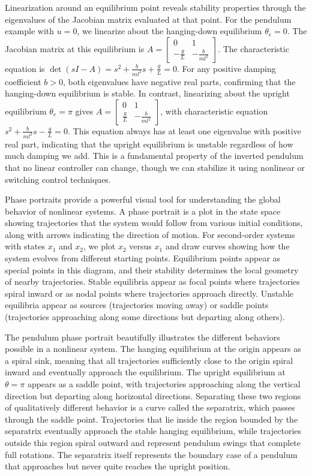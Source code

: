 Linearization around an equilibrium point reveals stability properties through the eigenvalues of the Jacobian matrix evaluated at that point. For the pendulum example with $u = 0$, we linearize about the hanging-down equilibrium $\theta_e = 0$. The Jacobian matrix at this equilibrium is $A = \begin{bmatrix} 0 & 1 \\ -\frac{g}{L} & -\frac{b}{ml^2} \end{bmatrix}$. The characteristic equation is $\det(sI - A) = s^2 + \frac{b}{ml^2}s + \frac{g}{L} = 0$. For any positive damping coefficient $b > 0$, both eigenvalues have negative real parts, confirming that the hanging-down equilibrium is stable. In contrast, linearizing about the upright equilibrium $\theta_e = \pi$ gives $A = \begin{bmatrix} 0 & 1 \\ \frac{g}{L} & -\frac{b}{ml^2} \end{bmatrix}$, with characteristic equation $s^2 + \frac{b}{ml^2}s - \frac{g}{L} = 0$. This equation always has at least one eigenvalue with positive real part, indicating that the upright equilibrium is unstable regardless of how much damping we add. This is a fundamental property of the inverted pendulum that no linear controller can change, though we can stabilize it using nonlinear or switching control techniques.

Phase portraits provide a powerful visual tool for understanding the global behavior of nonlinear systems. A phase portrait is a plot in the state space showing trajectories that the system would follow from various initial conditions, along with arrows indicating the direction of motion. For second-order systems with states $x_1$ and $x_2$, we plot $x_2$ versus $x_1$ and draw curves showing how the system evolves from different starting points. Equilibrium points appear as special points in this diagram, and their stability determines the local geometry of nearby trajectories. Stable equilibria appear as focal points where trajectories spiral inward or as nodal points where trajectories approach directly. Unstable equilibria appear as sources (trajectories moving away) or saddle points (trajectories approaching along some directions but departing along others).

The pendulum phase portrait beautifully illustrates the different behaviors possible in a nonlinear system. The hanging equilibrium at the origin appears as a spiral sink, meaning that all trajectories sufficiently close to the origin spiral inward and eventually approach the equilibrium. The upright equilibrium at $\theta = \pi$ appears as a saddle point, with trajectories approaching along the vertical direction but departing along horizontal directions. Separating these two regions of qualitatively different behavior is a curve called the separatrix, which passes through the saddle point. Trajectories that lie inside the region bounded by the separatrix eventually approach the stable hanging equilibrium, while trajectories outside this region spiral outward and represent pendulum swings that complete full rotations. The separatrix itself represents the boundary case of a pendulum that approaches but never quite reaches the upright position.

